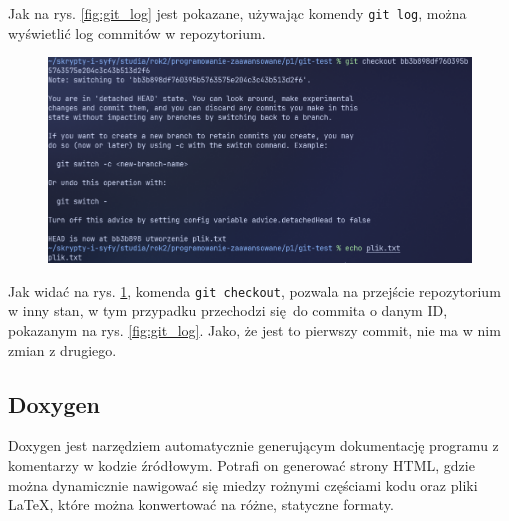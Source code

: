 Jak na rys. \ref{fig:git_log} jest pokazane, używając komendy \texttt{git log}, można wyświetlić log commitów w repozytorium.

\begin{figure}[H]
	\centering
	\includegraphics[width=1\textwidth]{images/git_checkout.png}
	\caption{}
	\label{fig:git_checkout}
\end{figure}

Jak widać na rys. \ref{fig:git_checkout}, komenda \texttt{git checkout}, pozwala na przejście repozytorium w inny stan, w tym przypadku przechodzi się do commita o danym ID, pokazanym na rys. \ref{fig:git_log}. Jako, że jest to pierwszy commit, nie ma w nim zmian z drugiego.
\subsection{Doxygen}
Doxygen\cite{doxygensite} jest narzędziem automatycznie generującym dokumentację programu z komentarzy w kodzie źródłowym. Potrafi on generować strony HTML, gdzie można dynamicznie nawigować się miedzy rożnymi częściami kodu oraz pliki \LaTeX, które można konwertować na różne, statyczne formaty.
